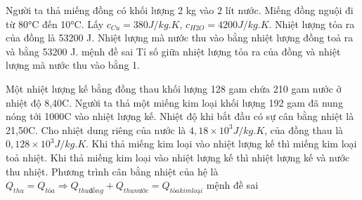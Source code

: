 \begin{ex}
Người ta thả miếng đồng có khối lượng 2 kg vào 2 lít nước. Miếng đồng nguội đi từ 80°C đến 10°C. Lấy $c_{Cu} = 380 J/kg.K$, $c_{H2O} = 4200 J/kg.K$.
\choiceTF
{\True Nhiệt lượng tỏa ra của đồng là 53200 J.}
{\True Nhiệt lượng mà nước thu vào bằng nhiệt lượng đồng toả ra và bằng 53200 J.}
{mệnh đề sai}
{\True Tỉ số giữa nhiệt lượng tỏa ra của đồng và nhiệt lượng mà nước thu vào bằng 1.}
\end{ex}

\begin{ex}
Một nhiệt lượng kế bằng đồng thau khối lượng 128 gam chứa 210 gam nước ở nhiệt độ 8,40C. Người ta thả một miếng kim loại khối lượng 192 gam đã nung nóng tới 1000C vào nhiệt lượng kế. Nhiệt độ khi bắt đầu có sự cân bằng nhiệt là 21,50C. Cho nhiệt dung riêng của nước là $4,18 \times 10^3 J/kg.K$, của đồng thau là $0,128 \times 10^3 J/kg.K$.
\choiceTF
{\True Khi thả miếng kim loại vào nhiệt lượng kế thì miếng kim loại toả nhiệt.}
{\True Khi thả miếng kim loại vào nhiệt lượng kế thì nhiệt lượng kế và nước thu nhiệt.}
{\True Phương trình cân bằng nhiệt của hệ là $Q_{thu} = Q_{tỏa} \Rightarrow Q_{thu đồng} + Q_{thu nước} = Q_{tỏa kim loại}$}
{mệnh đề sai}
\end{ex}


